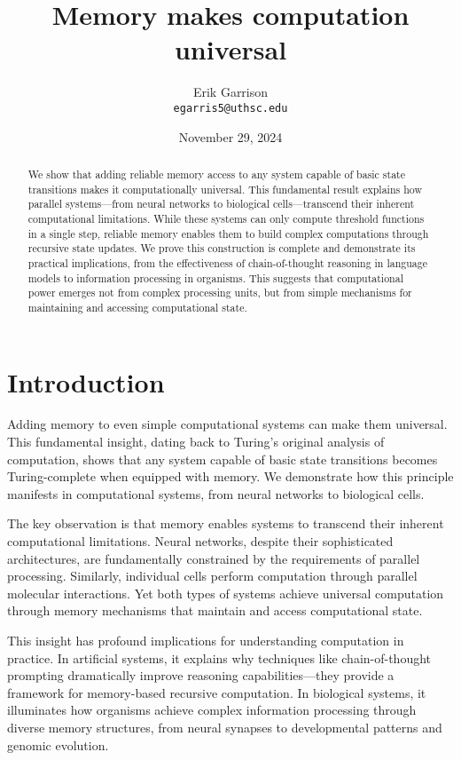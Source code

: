 \documentclass[12pt]{article}
\title{Memory makes computation universal}
\author{Erik Garrison\\
  \texttt{egarris5@uthsc.edu}\\[1ex]
  }
\date{November 29, 2024}
\begin{document}
\maketitle

\begin{abstract}
We show that adding reliable memory access to any system capable of basic state transitions makes it computationally universal. This fundamental result explains how parallel systems---from neural networks to biological cells---transcend their inherent computational limitations. While these systems can only compute threshold functions in a single step, reliable memory enables them to build complex computations through recursive state updates. We prove this construction is complete and demonstrate its practical implications, from the effectiveness of chain-of-thought reasoning in language models to information processing in organisms. This suggests that computational power emerges not from complex processing units, but from simple mechanisms for maintaining and accessing computational state.
\end{abstract}

\section{Introduction}
Adding memory to even simple computational systems can make them universal. This fundamental insight, dating back to Turing's original analysis of computation, shows that any system capable of basic state transitions becomes Turing-complete when equipped with memory. We demonstrate how this principle manifests in computational systems, from neural networks to biological cells.

The key observation is that memory enables systems to transcend their inherent computational limitations. Neural networks, despite their sophisticated architectures, are fundamentally constrained by the requirements of parallel processing. Similarly, individual cells perform computation through parallel molecular interactions. Yet both types of systems achieve universal computation through memory mechanisms that maintain and access computational state.

This insight has profound implications for understanding computation in practice. In artificial systems, it explains why techniques like chain-of-thought prompting dramatically improve reasoning capabilities---they provide a framework for memory-based recursive computation. In biological systems, it illuminates how organisms achieve complex information processing through diverse memory structures, from neural synapses to developmental patterns and genomic evolution.
\end{document}

